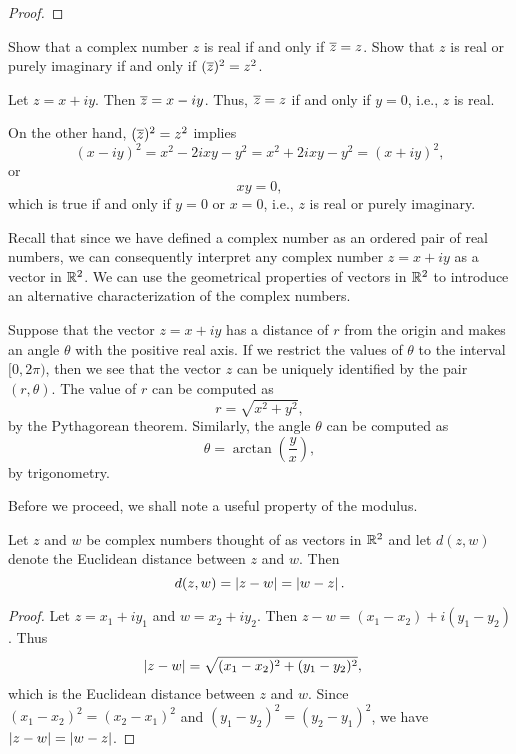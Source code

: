 \begin{proof}
\end{proof}

\begin{example}
    Show that a complex number \(z\) is real if and only if \(\overline{z} = z\). Show that \(z\) is real or purely imaginary if and only if \((\overline{z})^2 = z^2\).

    \begin{solution}
        Let \(z = x + iy\). Then \(\overline{z} = x - iy\). Thus, \(\overline{z} = z\) if and only if \(y = 0\), i.e., \(z\) is real.

        On the other hand, \((\overline{z})^2 = z^2\) implies
        \[
        (x - iy)^2 = x^2 - 2ixy - y^2 = x^2 + 2ixy - y^2 = (x + iy)^2,
        \]
        or
        \[
            xy = 0,
        \]
        which is true if and only if \(y = 0\) or \(x = 0\), i.e., \(z\) is real or purely imaginary.
    \end{solution}
\end{example}

Recall that since we have defined a complex number as an ordered pair of real numbers, we can consequently interpret any complex number \(z = x + iy\) as a vector in \(\mathbb{R}^2\). We can use the geometrical properties of vectors in \(\mathbb{R}^2\) to introduce an alternative characterization of the complex numbers.

Suppose that the vector \(z = x + iy\) has a distance of \(r\) from the origin and makes an angle \(\theta\) with the positive real axis. If we restrict the values of \(\theta\) to the interval \([0, 2\pi)\), then we see that the vector \(z\) can be uniquely identified by the pair \((r, \theta)\). The value of \(r\) can be computed as
\[
    r = \sqrt{x^2 + y^2},
\]
by the Pythagorean theorem. Similarly, the angle \(\theta\) can be computed as
\[
    \theta = \arctan\left(\frac{y}{x}\right),
\]
by trigonometry.

Before we proceed, we shall note a useful property of the modulus.

\begin{theorem}
    Let \(z\) and \(w\) be complex numbers thought of as vectors in \(\mathbb{R}^2\) and let \(d(z, w)\) denote the Euclidean distance between \(z\) and \(w\). Then
    \[
        d(z, w) = \left\lvert z - w \right\rvert = \left\lvert w - z \right\rvert.
    \]
    \label{thm:distance-modulus}
\end{theorem}

\begin{proof}
    Let \(z = x_1 + iy_1\) and \(w = x_2 + iy_2\). Then \(z - w = (x_1 - x_2) + i(y_1 - y_2)\). Thus
    \[
        \begin{aligned}
            \left\lvert z - w \right\rvert &= \sqrt{(x_1 - x_2)^2 + (y_1 - y_2)^2},
        \end{aligned}
    \]
    which is the Euclidean distance between \(z\) and \(w\). Since \((x_1 - x_2)^2 = (x_2 - x_1)^2\) and \((y_1 - y_2)^2 = (y_2 - y_1)^2\), we have \(\left\lvert z - w \right\rvert = \left\lvert w - z \right\rvert\).
\end{proof}

